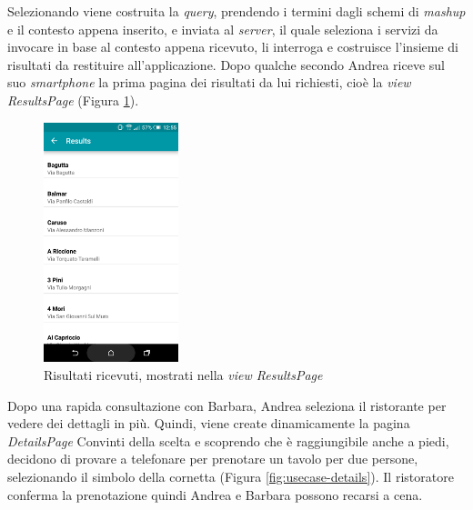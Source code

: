 Selezionando  viene costruita la \emph{query}, prendendo i termini dagli schemi di \emph{mashup} e il contesto appena inserito, e inviata al \emph{server}, il quale seleziona i servizi da invocare in base al contesto appena ricevuto, li interroga e costruisce l'insieme di risultati da restituire all'applicazione. Dopo qualche secondo Andrea riceve sul suo \emph{smartphone} la prima pagina dei risultati da lui richiesti, cioè la \textit{view} \emph{ResultsPage} (Figura \ref{fig:usecase-results}).

\begin{figure}[ht]
	\centering
	\includegraphics[width=0.35\textwidth]{4-progettazione-alto-livello/Immagini/results_caso_d'uso.png}
	\caption{Risultati ricevuti, mostrati nella \emph{view ResultsPage}}\label{fig:usecase-results}
\end{figure} 

Dopo una rapida consultazione con Barbara, Andrea seleziona il ristorante  per vedere dei dettagli in più. Quindi, viene create dinamicamente la pagina \emph{DetailsPage} Convinti della scelta e scoprendo che è raggiungibile anche a piedi, decidono di provare a telefonare per prenotare un tavolo per due persone, selezionando il simbolo della cornetta (Figura \ref{fig:usecase-details}). Il ristoratore conferma la prenotazione quindi Andrea e Barbara possono recarsi a cena. %

